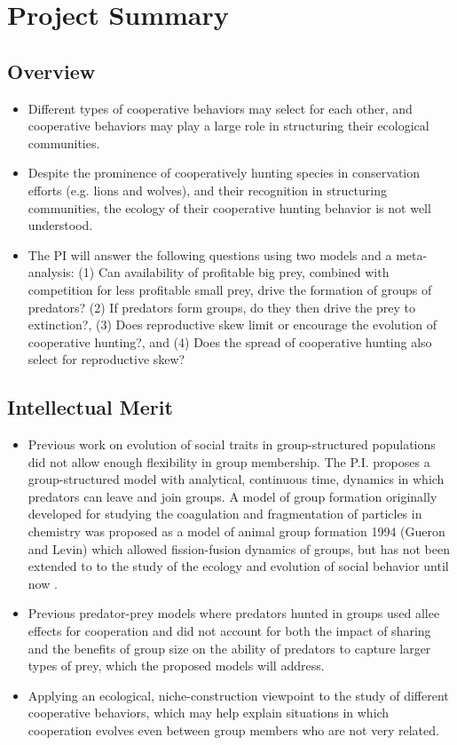 
\section{Project Summary}
\subsection{Overview}
\begin{itemize}
\item Different types of cooperative behaviors may select for each other, and cooperative behaviors may play a large role in structuring their ecological communities.
\item Despite the prominence of cooperatively hunting species in conservation efforts (e.g. lions and wolves), and their recognition in structuring communities, the ecology of their cooperative hunting behavior is not well understood.
\item The PI will answer the following questions using two models and a meta-analysis: (1) Can availability of profitable big prey, combined with competition for less profitable small prey, drive the formation of groups of predators? (2) If predators form groups, do they then drive the prey to extinction?, (3) Does reproductive skew limit or encourage the evolution of cooperative hunting?, and (4) Does the spread of cooperative hunting also select for reproductive skew?
\end{itemize}
\subsection{Intellectual Merit}
\begin{itemize}
\item Previous work on evolution of social traits in group-structured populations did not allow enough flexibility in group membership. The P.I. proposes a group-structured model with analytical, continuous time, dynamics in which predators can leave and join groups.  A model of group formation originally developed for studying the coagulation and fragmentation of particles in chemistry was proposed as a model of animal group formation 1994 (Gueron and Levin) which allowed fission-fusion dynamics of groups, but has not been extended to to the study of the ecology and evolution of social behavior until now . 
\item Previous predator-prey models where predators hunted in groups used allee effects for cooperation and did not account for both the impact of sharing and the benefits of group size on the ability of predators to capture larger types of prey, which the proposed models will address.
\item Applying an ecological, niche-construction viewpoint to the study of different cooperative behaviors, which may help explain situations in which cooperation evolves even between group members who are not very related.
\end{itemize}

